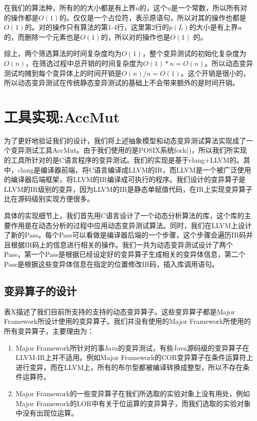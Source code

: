 \documentclass[nofonts]{ctexrep}
\begin{document}
在我们的算法种，所有的\ListSet 的大小都是有上界$u$的，这个$u$是一个常数，所以所有对\ListSet 的操作都是$O(1)$的。\DefaultSet 仅仅是一个占位符，表示原语句，所以对其的操作也都是$O(1)$的。对\VectorSet 的操作只有\filterm 算法的第1-4行，这里第2行的$p(L)$的大小是有上界$u$的，而\VectorSet 删除一个元素也是$O(1)$的，所以对\VectorSet 的操作也是$O(1)$ 的。

综上，两个筛选算法的时间复杂度均为$O(1)$，整个变异测试的初始化复杂度为$O(n)$，在筛选过程中总开销的时间复杂度为$O(1)*n = O(n)$。所以动态变异测试均摊到每个变异体上的时间开销是$O(n) / n = O(1)$。这个开销是很小的，所以动态变异测试在传统静态变异测试的基础上不会带来额外的是时间开销。

\chapter{工具实现:AccMut} 
为了更好地验证我们的设计，我们将上述抽象模型和动态变异测试算法实现成了一个变异测试工具AccMut。由于我们使用的是POSIX系统fork()，所以我们所实现的工具所针对的是C语言程序的变异测试。我们的实现是基于clang+LLVM的。其中，clang是编译器前端，将C语言编译成LLVM的IR，而LLVM是一个被广泛使用的编译器后端框架，将LLVM的IR编译成可执行的程序。我们设计的变异算子是LLVM的IR级别的变异，因为LLVM的IR是静态单赋值代码，在IR上实现变异算子比在源码级别实现方便很多。

具体的实现细节上，我们首先用C语言设计了一个动态分析算法的库，这个库的主要作用是在动态分析的过程中应用动态变异测试算法。同时，我们在LLVM上设计了新的Pass。每个Pass可以看做是编译器后端的一个步骤，这个步骤会遍历IR码并且根据IR码上的信息进行相关的操作。我们一共为动态变异测试设计了两个Pass，第一个Pass是根据已经设定好的变异算子生成相关的变异体信息，第二个Pass是根据这些变异体信息在指定的位置修改IR码，插入库调用语句。

\section{变异算子的设计}

表X描述了我们目前所支持的支持的动态变异算子。这些变异算子都是Major Framework所设计使用的变异算子。我们并没有使用的Major Framework所使用的所有变异算子，主要理由为：
\begin{enumerate}
\item Major Framework所针对的事Java的变异测试，有些Java源码级的变异算子在LLVM-IR上并不适用。例如Major Framework的COR变异算子在条件运算符上进行变异，而在LLVM上，所有的布尔型都被编译转换成整型，所以不存在条件运算符。
\item Major Framework的一些变异算子在我们所选取的实验对象上没有用处，例如Major Framework的LOR中有关于位运算的变异算子，而我们选取的实验对象中没有出现位运算。
\end{enumerate}
\end{document}
